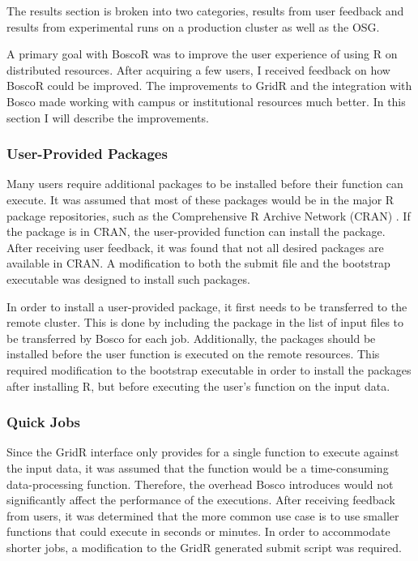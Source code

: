 The results section is broken into two categories, results from user feedback and results from experimental runs on a production cluster as well as the OSG.

A primary goal with BoscoR was to improve the user experience of using R on distributed resources. After acquiring a few users, I received feedback on how BoscoR could be improved.  The improvements to GridR and the integration with Bosco made working with campus or institutional resources much better.  In this section I will describe the improvements.

\subsubsection{User-Provided Packages}

Many users require additional packages to be installed before their function can execute.  It was assumed that most of these packages would be in the major R package repositories, such as the Comprehensive R Archive Network (CRAN) \cite{cran}.  If the package is in CRAN, the user-provided function can install the package.  After receiving user feedback, it was found that not all desired packages are available in CRAN.  A modification to both the submit file and the bootstrap executable was designed to install such packages.

In order to install a user-provided package, it first needs to be transferred to the remote cluster.  This is done by including the package in the list of input files to be transferred by Bosco for each job.  Additionally, the packages should be installed before the user function is executed on the remote resources.  This required modification to the bootstrap executable in order to install the packages after installing R, but before executing the user's function on the input data.

\subsubsection{Quick Jobs}
Since the GridR interface only provides for a single function to execute against the input data, it was assumed that the function would be a time-consuming data-processing function.  Therefore, the overhead Bosco introduces would not significantly affect the performance of the executions.  After receiving feedback from users, it was determined that the more common use case is to use smaller functions that could execute in seconds or minutes.  In order to accommodate shorter jobs, a modification to the GridR generated submit script was required.

